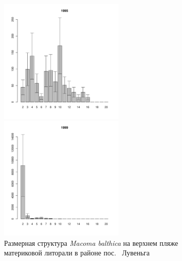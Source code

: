 \begin{figure}[hp]
	\begin{minipage}[b]{.3\linewidth}
	\begin{center}
	\includegraphics[width=60mm]{../White_Sea/Luvenga_II_razrez/high_beatch2_1995_.pdf}
	\end{center}
	\end{minipage}
	\hfill
	\begin{minipage}[b]{.3\linewidth}
	\begin{center}
	\includegraphics[width=60mm]{../White_Sea/Luvenga_II_razrez/high_beatch2_1999_.pdf}
	\end{center}
	\end{minipage}
	\hfill
	\begin{minipage}[b]{.3\linewidth}
	\begin{center}

	\end{center}
	\end{minipage}
\caption{Размерная структура {\it Macoma balthica} на верхнем пляже материковой литорали в районе пос.~ Лувеньга}
\label{ris:size_str_2razrez_high}
\end{figure}


